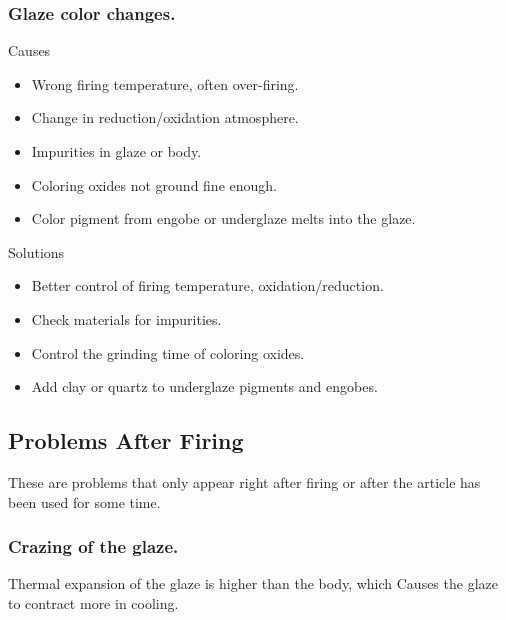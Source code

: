 \subsubsection{Glaze color changes.}
Causes
\begin{itemize}
\item Wrong firing temperature, often over-firing.
\item Change in reduction/oxidation atmosphere.
\item Impurities in glaze or body.
\item Coloring oxides not ground fine enough.
\item Color pigment from engobe or underglaze melts into the glaze.
\end{itemize}
Solutions
\begin{itemize}
\item Better control of firing temperature, oxidation/reduction.
\item Check materials for impurities.
\item Control the grinding time of coloring oxides.
\item Add clay or quartz to underglaze pigments and engobes.
\end{itemize}
\subsection{Problems After Firing}
These are problems that only appear right after firing or after the article has 
been used for some time.
\subsubsection{Crazing of the glaze.}
Thermal expansion of the glaze is higher than the body, which Causes the 
glaze to contract more in cooling.

